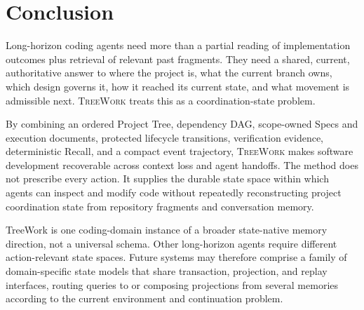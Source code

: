 \documentclass[11pt]{article}
\newcommand{\system}{\textsc{TreeWork}\xspace}
\theoremstyle{definition}
\begin{document}
\section{Conclusion}

Long-horizon coding agents need more than a partial reading of implementation
outcomes plus retrieval of relevant past fragments.  They need a shared,
current, authoritative answer to where the project is, what the current branch
owns, which design governs it, how it reached its current state, and what
movement is admissible next.  \system treats this as a coordination-state
problem.

By combining an ordered Project Tree, dependency DAG, scope-owned Specs
and execution documents, protected lifecycle transitions, verification
evidence, deterministic Recall, and a compact event trajectory, \system makes
software development recoverable across context loss and agent handoffs.  The
method does not prescribe every action.  It supplies the durable state space
within which agents can inspect and modify code without repeatedly
reconstructing project coordination state from repository fragments and
conversation memory.

TreeWork is one coding-domain instance of a broader state-native memory
direction, not a universal schema.  Other long-horizon agents require different
action-relevant state spaces.  Future systems may therefore comprise a family
of domain-specific state models that share transaction, projection, and replay
interfaces, routing queries to or composing projections from several memories
according to the current environment and continuation problem.



\end{document}
